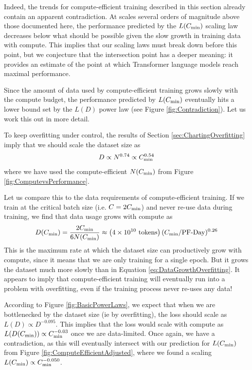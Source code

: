 \documentclass[english]{article}
\newcommand{\be}{\begin{equation}}
\newcommand{\ee}{\end{equation}}
\begin{document}
Indeed, the trends for compute-efficient training described in this section already contain an apparent contradiction. At scales several orders of magnitude above those documented here, the performance predicted by the $L(C_{\rm min})$ scaling law decreases below what should be possible given the slow growth in training data with compute.  This implies that our scaling laws must break down before this point, but we conjecture that the intersection point has a deeper meaning: it provides an estimate of the point at which Transformer language models reach maximal performance.

Since the amount of data used by compute-efficient training grows  slowly with the compute budget, the performance predicted by $L(C_{\rm min})$ eventually hits a lower bound set by the $L(D)$ power law (see Figure \ref{fig:Contradiction}).  Let us work this out in more detail.

To keep overfitting under control, the results of Section \ref{sec:ChartingOverfitting} imply that we should scale the dataset size as
\be
\label{eq:DataGrowthOverfitting}
D \propto N^{0.74} \propto C_{\rm min}^{0.54}
\ee
where we have used the compute-efficient $N(C_{\rm min})$ from Figure \ref{fig:ComputevsPerformance}.

Let us compare this to the data requirements of compute-efficient training.  If we train at the critical batch size (i.e. $C=2C_{\rm min}$) and never re-use data during training, we find that data usage grows with compute as
\be
D (C_{\rm min}) = \frac{2C_{\rm min}}{6 N(C_{\rm min})} \approx \left( 4 \times 10^{10}  \ {\rm tokens} \right) (C_{\rm min} / \mathrm{PF}{\text -}\mathrm{Day}  )^{0.26} 
\ee
This is the maximum rate at which the dataset size can productively grow with compute, since it means that we are only training for a single epoch.  But it grows the dataset much more slowly than in Equation \eqref{eq:DataGrowthOverfitting}.  It appears to imply that compute-efficient training will eventually run into a problem with overfitting, even if the training process never re-uses any data!

According to Figure \ref{fig:BasicPowerLaws}, we expect that when we are bottlenecked by the dataset size (ie by overfitting), the loss should scale as $L(D) \propto D^{-0.095}$.  This implies that the loss would scale with compute as $L(D(C_{\rm min})) \propto C_{\rm min}^{-0.03}$ once we are data-limited.  Once again, we have a contradiction, as this will eventually intersect with our prediction for $L(C_{\rm min})$ from Figure \ref{fig:ComputeEfficientAdjusted}, where we found a scaling $L(C_{\rm min}) \propto C_{\rm min}^{-0.050}$.  
\end{document}
